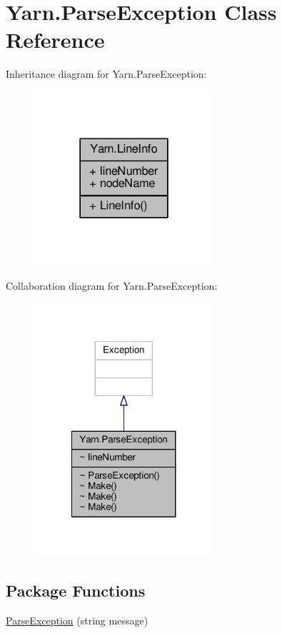 \hypertarget{a00149}{\section{Yarn.\-Parse\-Exception Class Reference}
\label{a00149}
}


Inheritance diagram for Yarn.\-Parse\-Exception\-:
\nopagebreak
\begin{figure}[H]
\begin{center}
\leavevmode
\includegraphics[width=188pt]{a00715}
\end{center}
\end{figure}


Collaboration diagram for Yarn.\-Parse\-Exception\-:
\nopagebreak
\begin{figure}[H]
\begin{center}
\leavevmode
\includegraphics[width=188pt]{a00716}
\end{center}
\end{figure}
\subsection*{Package Functions}
\begin{DoxyCompactItemize}
\item 
\hyperlink{a00149_aa3c4f5c8b0ae86097bbc46044df9f317}{Parse\-Exception} (string message)
\end{DoxyCompactItemize}
